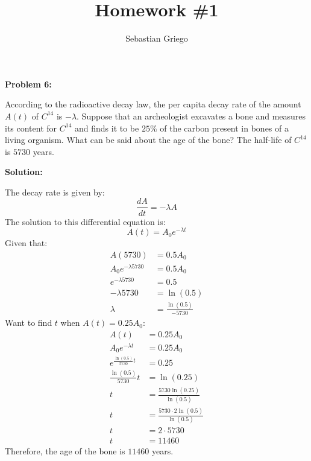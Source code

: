 \documentclass[12pt]{article}
\newenvironment{problem}[1]{
\textbf{Problem #1:}
}{
\rmfamily \vspace{1em}
}
\newenvironment{solution}{
\textbf{Solution:}

}{

\vspace{2em}
}
\begin{document}
\title{Homework \#1}  %
\author{Sebastian Griego}  %

\begin{problem}{6}
    According to the radioactive decay law, the per capita decay rate of the amount \(A(t)\) of \(C^{14}\) is \(-\lambda\). Suppose that an archeologist excavates a bone and measures its content for \(C^{14}\) and finds it to be \(25\%\) of the carbon present in bones of a living organism. What can be said about the age of the bone? The half-life of \(C^{14}\) is \(5730\) years.
\end{problem}

\begin{solution}
    The decay rate is given by:
    \[
        \frac{dA}{dt} = -\lambda A
    \]
    The solution to this differential equation is:
    \[
        A(t) = A_0 e^{-\lambda t}
    \]
    Given that:
    \[
        \begin{aligned}
            A(5730) &= 0.5A_0 \\
            A_0 e^{-\lambda 5730} &= 0.5A_0 \\
            e^{-\lambda 5730} &= 0.5 \\
            -\lambda 5730 &= \ln(0.5) \\
            \lambda &= \frac{\ln(0.5)}{-5730}
        \end{aligned}
    \]
    Want to find \(t\) when \(A(t) = 0.25A_0\):
    \[
        \begin{aligned}
            A(t) &= 0.25A_0 \\
            A_0 e^{-\lambda t} &= 0.25A_0 \\
            e^{\frac{\ln(0.5)}{5730}t} &= 0.25 \\
            \frac{\ln(0.5)}{5730}t &= \ln(0.25) \\
            t &= \frac{5730 \ln(0.25)}{\ln(0.5)}\\
            t &= \frac{5730 \cdot 2\ln(0.5)}{\ln(0.5)}\\
            t &= 2 \cdot 5730\\
            t &= 11460
        \end{aligned}
    \]
    Therefore, the age of the bone is \(11460\) years.
\end{solution}
\end{document}
